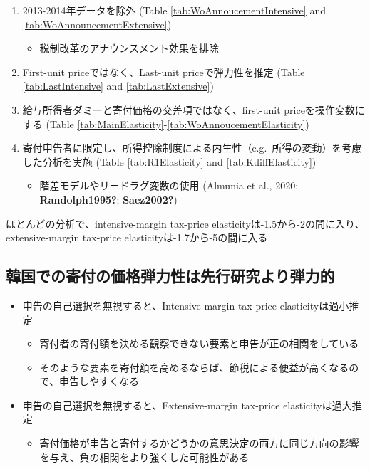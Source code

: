 \documentclass[
  11pt,
  a4paper,
]{article}
\providecommand{\tightlist}{%
  \setlength{\itemsep}{0pt}\setlength{\parskip}{0pt}}
\begin{document}
\begin{enumerate}
\def\labelenumi{\arabic{enumi}.}
\tightlist
\item
  2013-2014年データを除外 (Table \ref{tab:WoAnnoucementIntensive} and \ref{tab:WoAnnouncementExtensive})

  \begin{itemize}
  \tightlist
  \item
    税制改革のアナウンスメント効果を排除
  \end{itemize}
\item
  First-unit priceではなく、Last-unit priceで弾力性を推定 (Table \ref{tab:LastIntensive} and \ref{tab:LastExtensive})
\item
  給与所得者ダミーと寄付価格の交差項ではなく、first-unit priceを操作変数にする (Table \ref{tab:MainElasticity}-\ref{tab:WoAnnoucementElasticity})
\item
  寄付申告者に限定し、所得控除制度による内生性（e.g.~所得の変動）を考慮した分析を実施 (Table \ref{tab:R1Elasticity} and \ref{tab:KdiffElasticity})

  \begin{itemize}
  \tightlist
  \item
    階差モデルやリードラグ変数の使用 (Almunia et al., 2020; \textbf{Randolph1995?}; \textbf{Saez2002?})
  \end{itemize}
\end{enumerate}

ほとんどの分析で、intensive-margin tax-price elasticityは-1.5から-2の間に入り、
extensive-margin tax-price elasticityは-1.7から-5の間に入る

\hypertarget{ux97d3ux56fdux3067ux306eux5bc4ux4ed8ux306eux4fa1ux683cux5f3eux529bux6027ux306fux5148ux884cux7814ux7a76ux3088ux308aux5f3eux529bux7684}{%
\subsection{韓国での寄付の価格弾力性は先行研究より弾力的}\label{ux97d3ux56fdux3067ux306eux5bc4ux4ed8ux306eux4fa1ux683cux5f3eux529bux6027ux306fux5148ux884cux7814ux7a76ux3088ux308aux5f3eux529bux7684}}

\begin{itemize}
\tightlist
\item
  申告の自己選択を無視すると、Intensive-margin tax-price elasticityは過小推定

  \begin{itemize}
  \tightlist
  \item
    寄付者の寄付額を決める観察できない要素と申告が正の相関をしている
  \item
    そのような要素を寄付額を高めるならば、節税による便益が高くなるので、申告しやすくなる
  \end{itemize}
\item
  申告の自己選択を無視すると、Extensive-margin tax-price elasticityは過大推定

  \begin{itemize}
  \tightlist
  \item
    寄付価格が申告と寄付するかどうかの意思決定の両方に同じ方向の影響を与え、負の相関をより強くした可能性がある
  \end{itemize}
\end{itemize}
\end{document}

